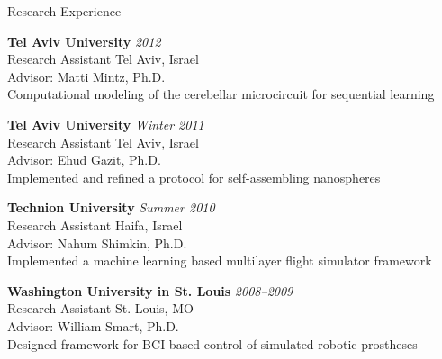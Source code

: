 \documentclass{resume} %
\begin{document}
\begin{rSection}{Research Experience}


\textbf{Tel Aviv University} \hfill \emph{2012} \\
Research Assistant \hfill Tel Aviv, Israel \\
Advisor: Matti Mintz, Ph.D. \\
Computational modeling of the cerebellar microcircuit for sequential learning

\textbf{Tel Aviv University} \hfill \emph{Winter 2011} \\
Research Assistant \hfill Tel Aviv, Israel \\
Advisor: Ehud Gazit, Ph.D. \\
Implemented and refined a protocol for self-assembling nanospheres

\textbf{Technion University} \hfill \emph{Summer 2010} \\
Research Assistant \hfill Haifa, Israel \\
Advisor: Nahum Shimkin, Ph.D. \\
Implemented a machine learning based multilayer flight simulator framework

\textbf{Washington University in St. Louis} \hfill \emph{2008--2009} \\
Research Assistant \hfill St. Louis, MO \\
Advisor: William Smart, Ph.D. \\
Designed framework for BCI-based control of simulated robotic prostheses

\end{rSection}

\end{document}
